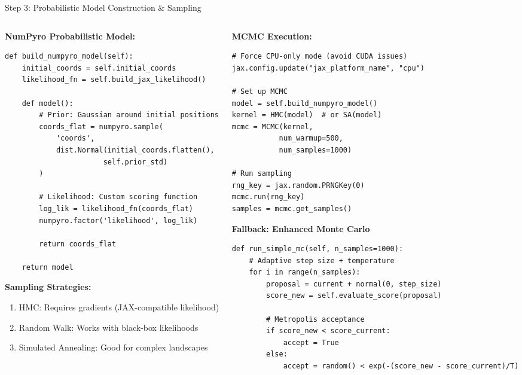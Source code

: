\documentclass[aspectratio=169]{beamer}
\begin{document}
\begin{frame}[fragile]{Step 3: Probabilistic Model Construction \& Sampling}
\begin{columns}[T]
\begin{column}{0.5\textwidth}
\textbf{NumPyro Probabilistic Model:}
\begin{lstlisting}
def build_numpyro_model(self):
    initial_coords = self.initial_coords
    likelihood_fn = self.build_jax_likelihood()
    
    def model():
        # Prior: Gaussian around initial positions
        coords_flat = numpyro.sample(
            'coords',
            dist.Normal(initial_coords.flatten(), 
                       self.prior_std)
        )
        
        # Likelihood: Custom scoring function
        log_lik = likelihood_fn(coords_flat)
        numpyro.factor('likelihood', log_lik)
        
        return coords_flat
    
    return model
\end{lstlisting}

\textbf{Sampling Strategies:}
\begin{enumerate}
    \item \alert{HMC}: Requires gradients (JAX-compatible likelihood)
    \item \alert{Random Walk}: Works with black-box likelihoods
    \item \alert{Simulated Annealing}: Good for complex landscapes
\end{enumerate}
\end{column}

\begin{column}{0.5\textwidth}
\textbf{MCMC Execution:}
\begin{lstlisting}
# Force CPU-only mode (avoid CUDA issues)
jax.config.update("jax_platform_name", "cpu")

# Set up MCMC
model = self.build_numpyro_model()
kernel = HMC(model)  # or SA(model)
mcmc = MCMC(kernel, 
           num_warmup=500, 
           num_samples=1000)

# Run sampling
rng_key = jax.random.PRNGKey(0)
mcmc.run(rng_key)
samples = mcmc.get_samples()
\end{lstlisting}

\vspace{0.3cm}
\textbf{Fallback: Enhanced Monte Carlo}
\begin{lstlisting}
def run_simple_mc(self, n_samples=1000):
    # Adaptive step size + temperature
    for i in range(n_samples):
        proposal = current + normal(0, step_size)
        score_new = self.evaluate_score(proposal)
        
        # Metropolis acceptance
        if score_new < score_current:
            accept = True
        else:
            accept = random() < exp(-(score_new - score_current)/T)
\end{lstlisting}
\end{column}
\end{columns}
\end{frame}
\end{document}

